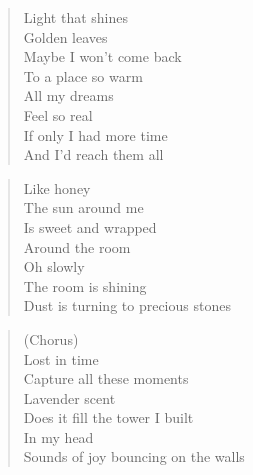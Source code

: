 \phantom{;}
\clearpage




\begin{minipage}{0.5\textwidth}
    \begin{verse}
    Light that shines \\
	Golden leaves \\
	Maybe I won't come back \\
	To a place so warm \\
	All my dreams \\
	Feel so real \\
	If only I had more time \\
	And I'd reach them all
    \end{verse}
    
    \begin{verse}
    Like honey \\
	The sun around me \\
	Is sweet and wrapped \\
	Around the room \\
	Oh slowly \\
	The room is shining \\
	Dust is turning to precious stones
    \end{verse}

    \begin{verse}
    (Chorus) \\
	Lost in time \\
	Capture all these moments \\
	Lavender scent \\
	Does it fill the tower I built \\
	In my head \\
	Sounds of joy bouncing on the walls
    \end{verse}

\end{minipage}
